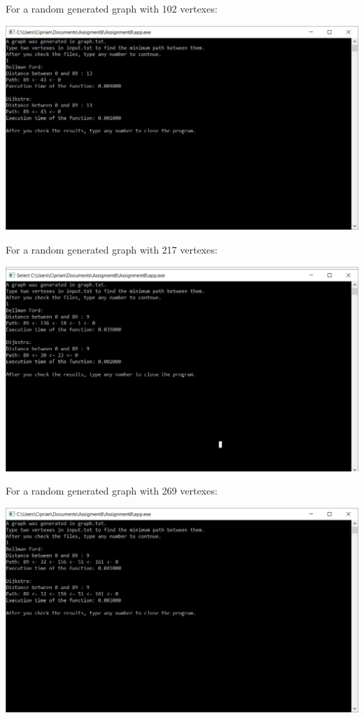 \documentclass[12]{article}
\begin{document}
For a random generated graph with 102 vertexes:

\begin{center}
\includegraphics[scale=0.6]{102.png}
\end{center}

For a random generated graph with 217 vertexes:

\begin{center}
\includegraphics[scale=0.6]{217.png}
\end{center}

For a random generated graph with 269 vertexes:

\begin{center}
\includegraphics[scale=0.6]{269.png}
\end{center}
\end{document}
